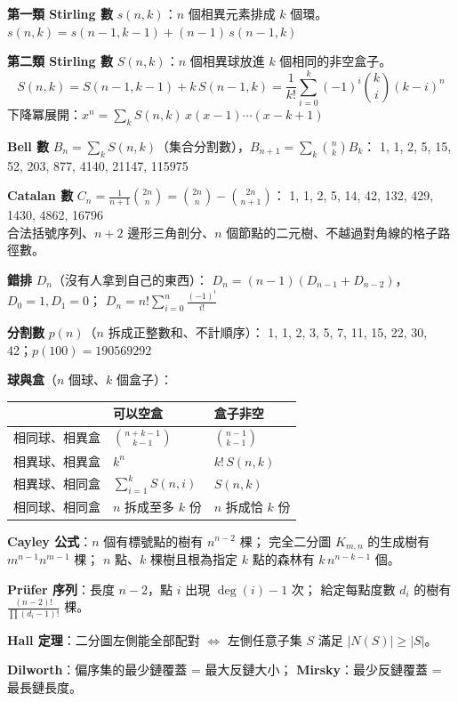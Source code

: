 {\setlength{\parindent}{0pt}
\textbf{第一類 Stirling 數} $s(n,k)$：$n$ 個相異元素排成 $k$ 個環。
$s(n,k) = s(n-1,k-1) + (n-1)\,s(n-1,k)$

\smallskip
\textbf{第二類 Stirling 數} $S(n,k)$：$n$ 個相異球放進 $k$ 個相同的非空盒子。
\[
S(n,k) = S(n-1,k-1) + k\,S(n-1,k) = \frac{1}{k!}\sum_{i=0}^{k}(-1)^i\binom{k}{i}(k-i)^n
\]
下降冪展開：$x^n = \sum_k S(n,k)\, x(x-1)\cdots(x-k+1)$

\smallskip
\textbf{Bell 數} $B_n = \sum_k S(n,k)$（集合分割數），$B_{n+1} = \sum_k \binom{n}{k}B_k$：
1, 1, 2, 5, 15, 52, 203, 877, 4140, 21147, 115975

\smallskip
\textbf{Catalan 數} $C_n = \frac{1}{n+1}\binom{2n}{n} = \binom{2n}{n} - \binom{2n}{n+1}$：
1, 1, 2, 5, 14, 42, 132, 429, 1430, 4862, 16796 \\
合法括號序列、$n+2$ 邊形三角剖分、$n$ 個節點的二元樹、不越過對角線的格子路徑數。

\smallskip
\textbf{錯排} $D_n$（沒有人拿到自己的東西）：
$D_n = (n-1)(D_{n-1} + D_{n-2})$，$D_0=1, D_1=0$；
$D_n = n!\sum_{i=0}^{n}\frac{(-1)^i}{i!}$

\smallskip
\textbf{分割數} $p(n)$（$n$ 拆成正整數和、不計順序）：
1, 1, 2, 3, 5, 7, 11, 15, 22, 30, 42；$p(100) = 190569292$

\smallskip
\textbf{球與盒}（$n$ 個球、$k$ 個盒子）：

\begin{tabular}{|l|l|l|}
\hline
 & 可以空盒 & 盒子非空 \\
\hline
相同球、相異盒 & $\binom{n+k-1}{k-1}$ & $\binom{n-1}{k-1}$ \\
相異球、相異盒 & $k^n$ & $k!\,S(n,k)$ \\
相異球、相同盒 & $\sum_{i=1}^{k} S(n,i)$ & $S(n,k)$ \\
相同球、相同盒 & $n$ 拆成至多 $k$ 份 & $n$ 拆成恰 $k$ 份 \\
\hline
\end{tabular}

\smallskip
\textbf{Cayley 公式}：$n$ 個有標號點的樹有 $n^{n-2}$ 棵；
完全二分圖 $K_{m,n}$ 的生成樹有 $m^{n-1}n^{m-1}$ 棵；
$n$ 點、$k$ 棵樹且根為指定 $k$ 點的森林有 $k\,n^{n-k-1}$ 個。

\textbf{Prüfer 序列}：長度 $n-2$，點 $i$ 出現 $\deg(i)-1$ 次；
給定每點度數 $d_i$ 的樹有 $\frac{(n-2)!}{\prod (d_i-1)!}$ 棵。

\smallskip
\textbf{Hall 定理}：二分圖左側能全部配對 $\iff$ 左側任意子集 $S$ 滿足 $|N(S)| \ge |S|$。

\textbf{Dilworth}：偏序集的最少鏈覆蓋 = 最大反鏈大小；
\textbf{Mirsky}：最少反鏈覆蓋 = 最長鏈長度。

}
